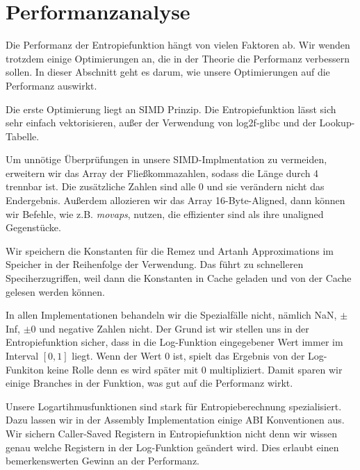 \section{Performanzanalyse}
Die Performanz der Entropiefunktion hängt von vielen Faktoren ab. Wir wenden trotzdem einige Optimierungen an, die in der Theorie die Performanz verbessern sollen. In dieser Abschnitt geht es darum, wie unsere Optimierungen auf die Performanz auswirkt.

Die erste Optimierung liegt an SIMD Prinzip. Die Entropiefunktion lässt sich sehr einfach vektorisieren, außer der Verwendung von log2f-glibc und der Lookup-Tabelle.

Um unnötige Überprüfungen in unsere SIMD-Implmentation zu vermeiden, erweitern wir das Array der Fließkommazahlen, sodass die Länge durch 4 trennbar ist. Die zusätzliche Zahlen sind alle $0$ und sie verändern nicht das Endergebnis. Außerdem allozieren wir das Array 16-Byte-Aligned, dann können wir Befehle, wie z.B. \emph{movaps}, nutzen, die effizienter sind als ihre unaligned Gegenstücke.

Wir speichern die Konstanten für die Remez und Artanh Approximations im Speicher in der Reihenfolge der Verwendung. Das führt zu schnelleren Speciherzugriffen, weil dann die Konstanten in Cache geladen und von der Cache gelesen werden können.


In allen Implementationen behandeln wir die Spezialfälle nicht, nämlich NaN, $\pm$Inf, $\pm$0 und negative Zahlen nicht. Der Grund ist wir stellen uns in der Entropiefunktion sicher, dass in die Log-Funktion eingegebener Wert immer im Interval $[0,1]$ liegt. Wenn der Wert $0$ ist, spielt das Ergebnis von der Log-Funkiton keine Rolle denn es wird später mit $0$ multipliziert. Damit sparen wir einige Branches in der Funktion, was gut auf die Performanz wirkt.

Unsere Logartihmusfunktionen sind stark für Entropieberechnung spezialisiert. Dazu lassen wir in der Assembly Implementation einige ABI Konventionen aus. Wir sichern Caller-Saved Registern in Entropiefunktion nicht denn wir wissen genau welche Registern in der Log-Funktion geändert wird. Dies erlaubt einen bemerkenswerten Gewinn an der Performanz.

